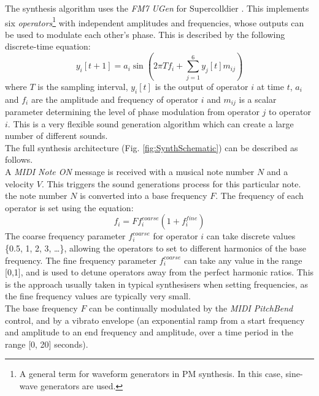 \documentclass[11pt, oneside]{report}   	%
\begin{document}
The synthesis algorithm uses the \emph{FM7 UGen} for Supercolldier \cite{UGen}. This implements six \emph{operators}\footnote{A general term for waveform generators in PM synthesis. In this case, sine-wave generators are used.} with independent amplitudes and frequencies, whose outputs can be used to modulate each other's phase. This is described by the following discrete-time equation: 
\begin{equation}
y_i[t+1] = a_i\sin(2\pi T f_i + \sum_{j = 1}^{6} y_j[t] m_{ij})
\end{equation}
where $T$ is the sampling interval,  $y_i[t]$ is the output of operator $i$ at time $t$, $a_i$ and $f_i$ are the amplitude and frequency of operator $i$ and $m_{ij}$ is a scalar parameter determining the level of phase modulation from operator $j$ to operator $i$. This is a very flexible sound generation algorithm which can create a large number of different sounds. \\
The full synthesis architecture (Fig. \ref{fig:SynthSchematic}) can be described as follows.\\
 A \emph{MIDI Note ON} message is received with a musical note number $N$ and a velocity $V$. This triggers the sound generations process for this particular note. the note number $N$ is converted into a base frequency $F$. The frequency of each operator is set using the equation: 
 \begin{equation}
	f_i = Ff_i^{coarse}(1+f_i^{fine})
 \end{equation}
The coarse frequency parameter $f_i^{coarse}$ for operator $i$ can take discrete values \{0.5, 1, 2, 3, \dots\}, allowing the operators to set to different harmonics of the base frequency. The fine frequency parameter $f_i^{coarse}$ can take any value in the range [0,1], and is used to detune operators away from the perfect harmonic ratios. This is the approach usually taken in typical synthesisers when setting frequencies, as the fine frequency values are typically very small.\\
The base frequency $F$ can be continually modulated by the \emph{MIDI PitchBend} control, and by a vibrato envelope (an exponential ramp from a start frequency and amplitude to an end frequency and amplitude, over a time period in the range [0, 20] seconds).
\end{document}
